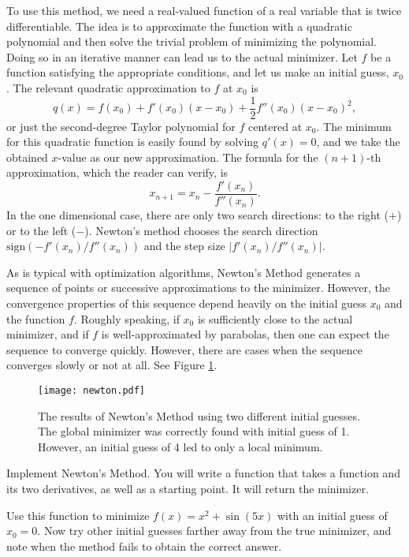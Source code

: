 To use this method, we need a real-valued function of a real variable that is twice differentiable.
The idea is to approximate the function with a quadratic polynomial and then solve the trivial problem of minimizing the polynomial.
Doing so in an iterative manner can lead us to the actual minimizer.
Let $f$ be a function satisfying the appropriate conditions, and let us make an initial guess, $x_0$.
The relevant quadratic approximation to $f$ at $x_0$ is
\begin{equation*}
q(x) = f(x_0) + f'(x_0)(x-x_0) + \frac{1}{2}f''(x_0)(x-x_0)^2,
\end{equation*}
or just the second-degree Taylor polynomial for $f$ centered at $x_0$.
The minimum for this quadratic function is easily found by solving $q'(x) = 0$, and we take the obtained $x$-value as our new approximation.
The formula for the $(n+1)$-th approximation, which the reader can verify, is
\begin{equation*}
x_{n+1} = x_n - \frac{f'(x_n)}{f''(x_n)}.
\end{equation*}
In the one dimensional case, there are only two search directions: to the right ($+$) or to the left ($-$).
Newton's method chooses the search direction $\text{sign}(-f'(x_n)/f''(x_n))$ and the step size $|f'(x_n)/f''(x_n)|$.

As is typical with optimization algorithms, Newton's Method generates a sequence of points or successive approximations to the minimizer.
However, the convergence properties of this sequence depend heavily on the initial guess $x_0$ and the function $f$.
Roughly speaking, if $x_0$ is sufficiently close to the actual minimizer, and if $f$ is well-approximated by parabolas, then one can expect the sequence to converge quickly.
However, there are cases when the sequence converges slowly or not at all.
See Figure \ref{linesearch:newton}.

\begin{figure}
\centering
\texttt{[image: newton.pdf]}
\caption{The results of Newton's Method using two different initial guesses.
The global minimizer was correctly found with initial guess of 1.
However, an initial guess of 4 led to only a local minimum.}
\label{linesearch:newton}
\end{figure}

\begin{problem}
Implement Newton's Method.
You will write a function that takes a function and its two derivatives, as well as a starting point.
It will return the minimizer.

Use this function to minimize $f(x) = x^2 + \sin(5x)$ with an initial guess of $x_0 = 0$.
Now try other initial guesses farther away from the true minimizer, and note when the method fails to obtain the correct answer.
\end{problem}

